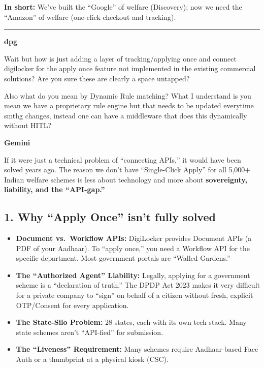 \documentclass[11pt,a4paper]{article}
\begin{document}
\textbf{In short:} We've built the ``Google'' of welfare (Discovery); now we need the ``Amazon'' of welfare (one-click checkout and tracking).

\bigskip
\hrule
\bigskip


{\small\color{primary}\textbf{dpg}}
\begin{mebox}
Wait but how is just adding a layer of tracking/applying once and connect digilocker for the apply once feature not implemented in the existing commercial solutions? Are you sure these are clearly a space untapped?

Also what do you mean by Dynamic Rule matching? What I understand is you mean we have a proprietary rule engine but that needs to be updated everytime smthg changes, instead one can have a middleware that does this dynamically without HITL?
\end{mebox}

{\small\color{secondary}\textbf{Gemini}}\vspace{2pt}

If it were just a technical problem of ``connecting APIs,'' it would have been solved years ago. The reason we don't have ``Single-Click Apply'' for all 5,000+ Indian welfare schemes is less about technology and more about \textbf{sovereignty, liability, and the ``API-gap.''}

\subsection*{1. Why ``Apply Once'' isn't fully solved}
\begin{itemize}[nosep]
\item \textbf{Document vs.\ Workflow APIs:} DigiLocker provides Document APIs (a PDF of your Aadhaar). To ``apply once,'' you need a Workflow API for the specific department. Most government portals are ``Walled Gardens.''
\item \textbf{The ``Authorized Agent'' Liability:} Legally, applying for a government scheme is a ``declaration of truth.'' The DPDP Act 2023 makes it very difficult for a private company to ``sign'' on behalf of a citizen without fresh, explicit OTP/Consent for every application.
\item \textbf{The State-Silo Problem:} 28 states, each with its own tech stack. Many state schemes aren't ``API-fied'' for submission.
\item \textbf{The ``Liveness'' Requirement:} Many schemes require Aadhaar-based Face Auth or a thumbprint at a physical kiosk (CSC).
\end{itemize}
\end{document}
